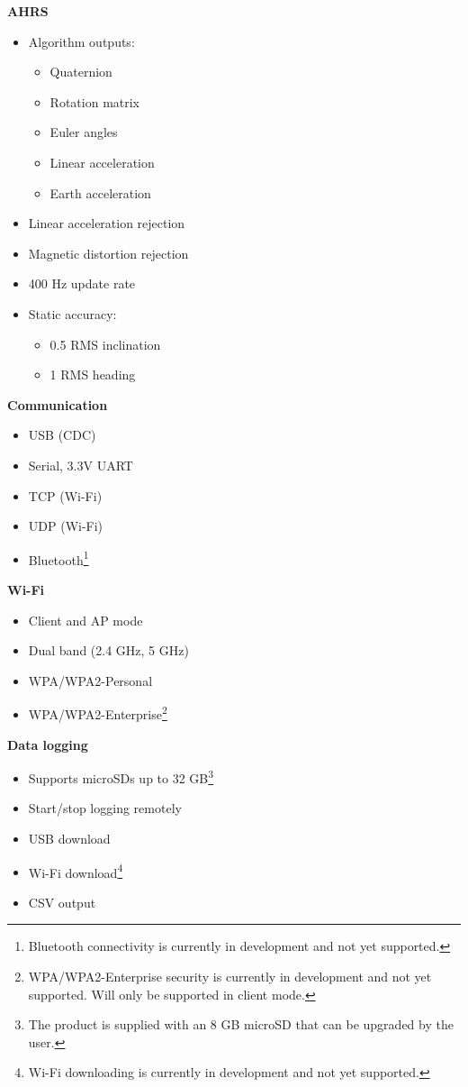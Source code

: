 \begin{multicols}{2}
\textbf{\acs{AHRS}}
\begin{itemize}[nolistsep]
    \item Algorithm outputs:
    \begin{itemize}
        \item Quaternion
        \item Rotation matrix
        \item Euler angles
        \item Linear acceleration
        \item Earth acceleration
    \end{itemize}
    \item Linear acceleration rejection
    \item Magnetic distortion rejection
    \item 400 Hz update rate
    \item Static accuracy:
        \begin{itemize}
            \item 0.5\textdegree{} \acs{RMS} inclination
            \item 1\textdegree{} \acs{RMS} heading
        \end{itemize}
\end{itemize}

\columnbreak

\textbf{Communication}
\begin{itemize}[nolistsep]
    \item \acs{USB} (\acs{CDC})
    \item Serial, 3.3V \acs{UART}
    \item \acs{TCP} (Wi-Fi)
    \item \acs{UDP} (Wi-Fi)
    \item Bluetooth\footnote{Bluetooth connectivity is currently in development and not yet supported.}
\end{itemize}

\textbf{Wi-Fi}
\begin{itemize}[nolistsep]
    \item Client and \acs{AP} mode
    \item Dual band (2.4 GHz, 5 GHz)
    \item WPA/WPA2-Personal
    \item WPA/WPA2-Enterprise\footnote{WPA/WPA2-Enterprise security is currently in development and not yet supported. Will only be supported in client mode.}
\end{itemize}

\textbf{Data logging}
\begin{itemize}[nolistsep]
    \item Supports \acsp{microSD} up to 32 GB\footnote{The product is supplied with an 8 GB \acs{microSD} that can be upgraded by the user.}
    \item Start/stop logging remotely
    \item USB download
    \item Wi-Fi download\footnote{Wi-Fi downloading is currently in development and not yet supported.}
    \item \acs{CSV} output
\end{itemize}


\end{multicols}

